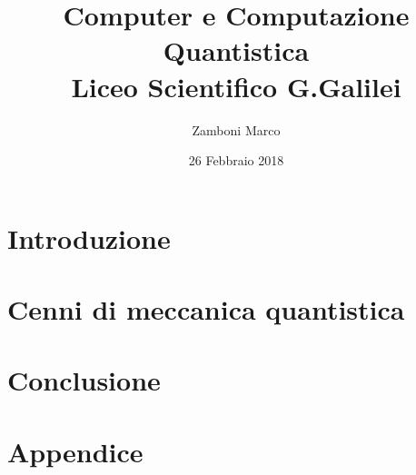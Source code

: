 \documentclass[10pt]{report}
\author{Zamboni Marco}
\date{26 Febbraio 2018}
\title{{Computer e Computazione Quantistica}\\
		{\large Liceo Scientifico G.Galilei}}
\begin{document}

\tableofcontents
\chapter{Introduzione}

\chapter{Cenni di meccanica quantistica}

\chapter{Conclusione}

\appendix
\chapter{Appendice}

\end{document}
